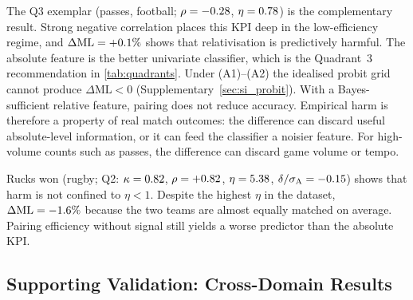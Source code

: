 The Q3 exemplar (passes, football; $\rho=-0.28$, $\eta=0.78$) is the complementary result. Strong negative correlation places this KPI deep in the low-efficiency regime, and $\Delta\mathrm{ML}=+0.1\%$ shows that relativisation is predictively harmful. The absolute feature is the better univariate classifier, which is the Quadrant~3 recommendation in \cref{tab:quadrants}. Under (A1)--(A2) the idealised probit grid cannot produce $\Delta\mathrm{ML}<0$ (Supplementary~\cref{sec:si_probit}). With a Bayes-sufficient relative feature, pairing does not reduce accuracy. Empirical harm is therefore a property of real match outcomes: the difference can discard useful absolute-level information, or it can feed the classifier a noisier feature. For high-volume counts such as passes, the difference can discard game volume or tempo.

Rucks won (rugby; Q2: $\kappa=0.82$, $\rho=+0.82$, $\eta=5.38$, $\delta/\sigma_{\mathrm{A}}=-0.15$) shows that harm is not confined to $\eta<1$. Despite the highest $\eta$ in the dataset, $\Delta\mathrm{ML}=-1.6\%$ because the two teams are almost equally matched on average. Pairing efficiency without signal still yields a worse predictor than the absolute KPI.

\subsection{Supporting Validation: Cross-Domain Results}

